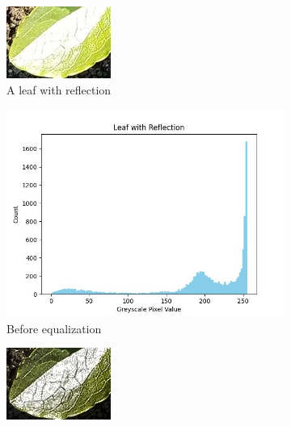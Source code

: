 \documentclass[letterpaper]{article}
\begin{document}
{%
\begin{figure}[h]
	\centering
	\begin{subfigure}[t]{.24\textwidth}
	  \centering
	  \includegraphics[width=.8\textwidth]{figures/reflection.jpg}
	  \caption{A leaf with reflection}
	  \label{fig:leaf-with-reflection}
	\end{subfigure}
	\begin{subfigure}[t]{.24\textwidth}
	  \centering
	  \includegraphics[width=.8\textwidth]{figures/reflection-histogram.jpg}
	  \caption{Before equalization}
	  \label{fig:reflection-histogram}
	\end{subfigure}
	\begin{subfigure}[t]{.24\textwidth}
	  \centering
	  \includegraphics[width=.8\textwidth]{figures/reflection.equalized.jpg}

\end{subfigure}
\end{figure}}
\end{document}
